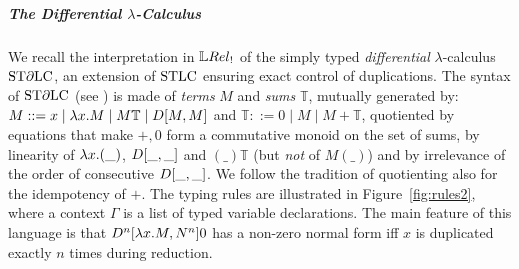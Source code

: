 \subparagraph*{The Differential $\lambda$-Calculus}\label{sec:STDLC}

We recall the interpretation in $\LREL_{!}$ of the simply typed \emph{differential} $\lambda$-calculus $\mathrm{ST}\partial\mathrm{LC}$,  
 an extension of $\mathrm{STLC}$ ensuring exact control of duplications. The syntax of $\mathrm{ST}\partial\mathrm{LC}$ (see \cite[Section 3]{Manzo2010}) is made of \emph{terms} $M$ and \emph{sums} $\mathbb T$, mutually generated by: $M::= x\mid \lambda x.M \mid M\mathbb T \mid \Diff{M}{M}$ and $\mathbb T::= 0 \mid M \mid M+\mathbb T$,
quotiented by equations that make $+,0$ form a commutative monoid on the set of sums, %
by linearity of $\lambda x.(\_)$, $\Diff{\_}{\_}$ and $(\_)\mathbb T$ (but \emph{not} of $M(\_)$) and by irrelevance of the order of consecutive $\Diff{\_}{\_}$.
We follow the tradition of quotienting also for the idempotency of $+$.
The typing rules are illustrated in Figure~\ref{fig:rules2}, where a context $\Gamma$ is a list of typed variable declarations.
The main feature of this language is that $\Der^n[\lambda x.M,N^n]0$ has a non-zero normal form iff $x$ is duplicated exactly $n$ times during reduction.

